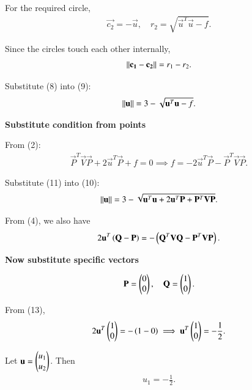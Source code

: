 \documentclass[journal]{IEEEtran}
\begin{document}
For the required circle,
\begin{align}
\vec{c_2} = -\vec{u}, \quad r_2 = \sqrt{\vec{u}^{T}\vec{u} - f}. \label{eq:c2r2}
\end{align}

Since the circles touch each other internally,
\begin{align}
\left\lVert\mathbf{c_1} - \mathbf{c_2}\right\rVert = r_1 - r_2. \label{eq:tangent}
\end{align}

Substitute (8) into (9):
\begin{align}
\left\lVert\mathbf{u}\right\rVert = 3 - \sqrt{\mathbf{u}^{T}\mathbf{u} - f}. \label{eq:relation}
\end{align}

\textbf{Substitute condition from points}

From (2):
\begin{align}
\vec{P}^{T}\vec{V}\vec{P} + 2\vec{u}^{T}\vec{P} + f = 0 \implies f = -2\vec{u}^{T}\vec{P} - \vec{P}^{T}\vec{V}\vec{P}. \label{eq:f}
\end{align}

Substitute (11) into (10):
\begin{align}
\left\lVert\mathbf{u}\right\rVert = 3 - \sqrt{\mathbf{u}^{T}\mathbf{u} + 2\mathbf{u}^{T}\mathbf{P} + \mathbf{P}^{T}\mathbf{V}\mathbf{P}}.
\label{eq:u_equation}
\end{align}

From (4), we also have
\begin{align}
2\mathbf{u}^{T}\left(\mathbf{Q} - \mathbf{P}\right) = -\left(\mathbf{Q}^{T}\mathbf{V}\mathbf{Q} - \mathbf{P}^{T}\mathbf{V}\mathbf{P}\right).
\label{eq:u_cond}
\end{align}

\textbf{Now substitute specific vectors}

\begin{align}
\mathbf{P} = \begin{pmatrix}0\\0\end{pmatrix}, \quad \mathbf{Q} = \begin{pmatrix}1\\0\end{pmatrix}.
\end{align}

From (13),
\begin{align}
2\mathbf{u}^{T}\begin{pmatrix}1\\0\end{pmatrix} = -\left(1 - 0\right) \implies \mathbf{u}^{T}\begin{pmatrix}1\\0\end{pmatrix} = -\frac{1}{2}.
\end{align}

Let $\mathbf{u} = \begin{pmatrix}u_1\\u_2\end{pmatrix}$. Then
\begin{align}
u_1 = -\frac{1}{2}.
\end{align}
\end{document}
